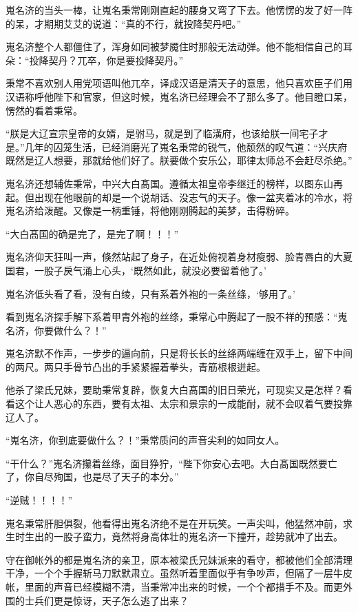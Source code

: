 嵬名济的当头一棒，让嵬名秉常刚刚直起的腰身又弯了下去。他愣愣的发了好一阵的呆，才期期艾艾的说道：“真的不行，就投降契丹吧。”

嵬名济整个人都僵住了，浑身如同被梦魇住时那般无法动弹。他不能相信自己的耳朵：“投降契丹？兀卒，你是要投降契丹。”

秉常不喜欢别人用党项语叫他兀卒，译成汉语是清天子的意思，他只喜欢臣子们用汉语称呼他陛下和官家，但这时候，嵬名济已经理会不了那么多了。他目瞪口呆，愣然的看着秉常。

“朕是大辽宣宗皇帝的女婿，是驸马，就是到了临潢府，也该给朕一间宅子才是。”几年的囚笼生活，已经消磨光了嵬名秉常的锐气，他颓然的叹气道：“兴庆府既然是辽人想要，那就给他们好了。朕要做个安乐公，耶律太师总不会赶尽杀绝。”

嵬名济还想辅佐秉常，中兴大白髙国。遵循太祖皇帝李继迁的榜样，以图东山再起。但出现在他眼前的却是一个说胡话、没志气的天子。像一盆夹着冰的冷水，将嵬名济给泼醒。又像是一柄重锤，将他刚刚腾起的美梦，击得粉碎。

“大白髙国的确是完了，是完了啊！！！”

嵬名济仰天狂叫一声，倏然站起了身子，在近处俯视着身材瘦弱、脸青唇白的大夏国君，一股子戾气涌上心头，‘既然如此，就没必要留着他了。’

嵬名济低头看了看，没有白绫，只有系着外袍的一条丝绦，‘够用了。’

看到嵬名济探手解下系着甲胄外袍的丝绦，秉常心中腾起了一股不祥的预感：“嵬名济，你要做什么？！”

嵬名济默不作声，一步步的逼向前，只是将长长的丝绦两端缠在双手上，留下中间的两尺。两只手骨节凸出的手紧紧握着拳头，青筋根根迸起。

他杀了梁氏兄妹，要助秉常复辟，恢复大白髙国的旧日荣光，可现实又是怎样？看看这个让人恶心的东西，要有太祖、太宗和景宗的一成能耐，就不会叹着气要投靠辽人了。

“嵬名济，你到底要做什么？！”秉常质问的声音尖利的如同女人。

“干什么？”嵬名济攥着丝绦，面目狰狞，“陛下你安心去吧。大白髙国既然要亡了，你自尽殉国，也是尽了天子的本分。”

“逆贼！！！！”

嵬名秉常肝胆俱裂，他看得出嵬名济绝不是在开玩笑。一声尖叫，他猛然冲前，求生时生出的一股子蛮力，竟然将身高体壮的嵬名济一下撞开，趁势就冲了出去。

守在御帐外的都是嵬名济的亲卫，原本被梁氏兄妹派来的看守，都被他们全部清理干净，一个个手握斩马刀默默肃立。虽然听着里面似乎有争吵声，但隔了一层牛皮帐，里面的声音已经模糊不清，当秉常冲出来的时候，一个个都措手不及。而更外围的士兵们更是惊讶，天子怎么逃了出来？

